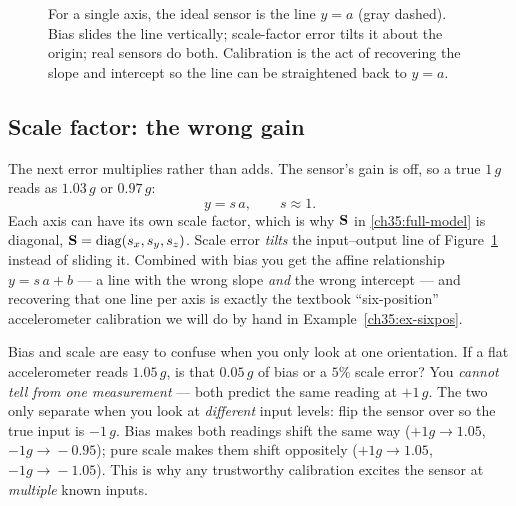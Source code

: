 \begin{figure}[H]
\centering
{}
\caption{For a single axis, the ideal sensor is the line $y=a$ (gray dashed).
Bias slides the line vertically; scale-factor error tilts it about the origin;
real sensors do both. Calibration is the act of recovering the slope and
intercept so the line can be straightened back to $y=a$.}
\label{ch35:fig-bias-scale}
\end{figure}

\subsection{Scale factor: the wrong gain}
\label{ch35:scale}

The next error multiplies rather than adds. The sensor's gain is off, so a true
$1\,g$ reads as $1.03\,g$ or $0.97\,g$:
\begin{equation}
  y = s\,a, \qquad s \approx 1.
  \label{ch35:scale-scalar}
\end{equation}
Each axis can have its own scale factor, which is why $\mathbf{S}$ in
\eqref{ch35:full-model} is diagonal, $\mathbf{S}=\operatorname{diag}(s_x,s_y,s_z)$. Scale error
\emph{tilts} the input--output line of Figure~\ref{ch35:fig-bias-scale} instead
of sliding it. Combined with bias you get the affine relationship $y = s\,a + b$
--- a line with the wrong slope \emph{and} the wrong intercept --- and recovering
that one line per axis is exactly the textbook ``six-position'' accelerometer
calibration we will do by hand in Example~\ref{ch35:ex-sixpos}.

\begin{trapbox}
Bias and scale are easy to confuse when you only look at one orientation. If a
flat accelerometer reads $1.05\,g$, is that $0.05\,g$ of bias or a $5\%$ scale
error? You \emph{cannot tell from one measurement} --- both predict the same
reading at $+1\,g$. The two only separate when you look at \emph{different} input
levels: flip the sensor over so the true input is $-1\,g$. Bias makes both
readings shift the same way ($+1g\!\to\!1.05$, $-1g\!\to\!-0.95$); pure scale
makes them shift oppositely ($+1g\!\to\!1.05$, $-1g\!\to\!-1.05$). This is why
any trustworthy calibration excites the sensor at \emph{multiple} known inputs.
\end{trapbox}

